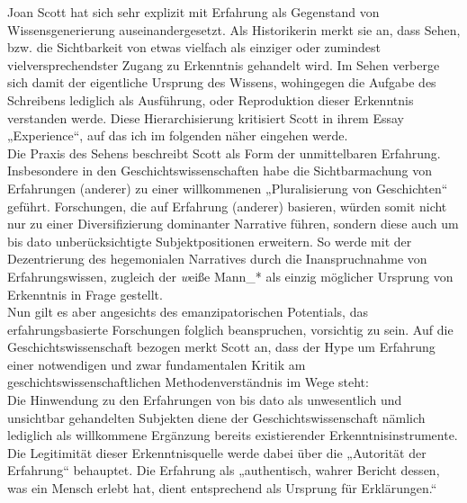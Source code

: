 Joan Scott hat sich sehr explizit mit Erfahrung als Gegenstand von
Wissensgenerierung auseinandergesetzt. Als Historikerin merkt sie an, dass
Sehen, bzw. die Sichtbarkeit von etwas vielfach als einziger oder zumindest
vielversprechendster Zugang zu Erkenntnis gehandelt wird. Im Sehen verberge
sich damit der eigentliche Ursprung des Wissens, wohingegen die Aufgabe des
Schreibens lediglich als Ausführung, oder Reproduktion dieser Erkenntnis
verstanden werde. Diese Hierarchisierung kritisiert Scott in ihrem Essay
„Experience“\footnotemark {}, auf das ich im folgenden näher eingehen werde.\\
Die Praxis des Sehens beschreibt Scott als Form der unmittelbaren Erfahrung.
Insbesondere in den Geschichtswissenschaften habe die Sichtbarmachung von
Erfahrungen (anderer) zu einer willkommenen „Pluralisierung von
Geschichten“\footnotemark {} geführt. Forschungen, die auf Erfahrung (anderer) basieren, würden somit
nicht nur zu einer Diversifizierung dominanter Narrative führen, sondern diese
auch um bis dato unberücksichtigte Subjektpositionen erweitern.\footnotemark {} So werde mit
der Dezentrierung des hegemonialen Narratives durch die Inanspruchnahme von
Erfahrungswissen, zugleich der \textit{w}eiße Mann\_* als einzig möglicher Ursprung von
Erkenntnis in Frage gestellt. \\
Nun gilt es aber angesichts des emanzipatorischen Potentials, das
erfahrungsbasierte Forschungen folglich beanspruchen, vorsichtig zu sein. Auf
die Geschichtswissenschaft bezogen merkt Scott an, dass der Hype um Erfahrung
einer notwendigen und zwar fundamentalen Kritik am geschichtswissenschaftlichen
Methodenverständnis im Wege steht: \\
Die Hinwendung zu den Erfahrungen von bis
dato als unwesentlich und unsichtbar gehandelten Subjekten diene der
Geschichtswissenschaft nämlich lediglich als willkommene Ergänzung bereits
existierender Erkenntnisinstrumente. Die Legitimität dieser Erkenntnisquelle
werde dabei über die „Autorität der Erfahrung“\footnotemark
{} behauptet. Die Erfahrung als „authentisch, wahrer
Bericht dessen, was ein Mensch erlebt hat, dient entsprechend als Ursprung für
Erklärungen.“\footnotemark {}\\

